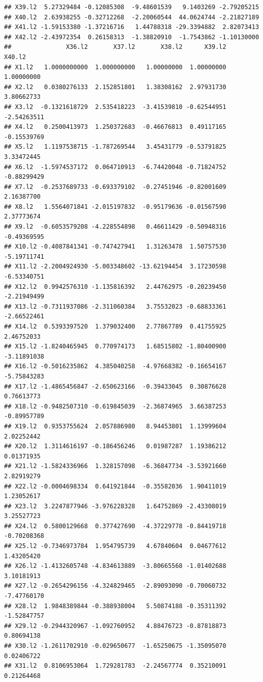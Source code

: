 \documentclass[]{article}
\begin{document}
\begin{verbatim}
## X39.l2  5.27329484 -0.12085308  -9.48601539   9.1403269 -2.79205215
## X40.l2  2.63938255 -0.32712268  -2.20060544  44.0624744 -2.21827189
## X41.l2 -1.59153380 -1.37216716   1.44788318 -29.3394882  2.82073413
## X42.l2 -2.43972354  0.26158313  -1.38820910  -1.7543862 -1.10130000
##               X36.l2       X37.l2       X38.l2      X39.l2      X40.l2
## X1.l2   1.0000000000  1.000000000   1.00000000  1.00000000  1.00000000
## X2.l2   0.0380276133  2.152851801   1.38308162  2.97931730  3.80662733
## X3.l2  -0.1321618729  2.535418223  -3.41539810 -0.62544951 -2.54263511
## X4.l2   0.2500413973  1.250372683  -0.46676813  0.49117165 -0.15539769
## X5.l2   1.1197538715 -1.787269544   3.45431779 -0.53791825  3.33472445
## X6.l2  -1.5974537172  0.064710913  -6.74420048 -0.71824752 -0.88299429
## X7.l2  -0.2537689733 -0.693379102  -0.27451946 -0.82001609  2.16387700
## X8.l2   1.5564071841 -2.015197832  -0.95179636 -0.01567590  2.37773674
## X9.l2  -0.6053579208 -4.228554898   0.46611429 -0.50948316 -0.49369595
## X10.l2 -0.4087841341 -0.747427941   1.31263478  1.50757530 -5.19711741
## X11.l2 -2.2004924930 -5.003348602 -13.62194454  3.17230598 -6.53340751
## X12.l2  0.9942576310 -1.135816392   2.44762975 -0.20239450 -2.21949499
## X13.l2 -0.7311937086 -2.311060384   3.75532023 -0.68833361 -2.66522461
## X14.l2  0.5393397520  1.379032400   2.77867789  0.41755925  2.46752033
## X15.l2 -1.8240465945  0.770974173   1.68515802 -1.80400900 -3.11891038
## X16.l2 -0.5016235862  4.385040258  -4.97668382 -0.16654167 -5.75843283
## X17.l2 -1.4865456847 -2.650623166  -0.39433045  0.30876628  0.76613773
## X18.l2 -0.9482507310 -0.619845039  -2.36874965  3.66387253 -0.89957789
## X19.l2  0.9353755624  2.057886980   8.94453801  1.13999604  2.02252442
## X20.l2  1.3114616197 -0.186456246   0.01987287  1.19386212  0.01371935
## X21.l2 -1.5824336966  1.328157098  -6.36847734 -3.53921660  2.82919279
## X22.l2 -0.0004698334  0.641921844  -0.35582036  1.90411019  1.23052617
## X23.l2  3.2247877946 -3.976228328   1.64752869 -2.43308019  3.25527723
## X24.l2  0.5800129668  0.377427690  -4.37229778 -0.84419718 -0.70208368
## X25.l2 -0.7346973784  1.954795739   4.67840604  0.04677612  1.43205420
## X26.l2 -1.4132605748 -4.834613889  -3.80665568 -1.01402688  3.10181913
## X27.l2 -0.2654296156 -4.324829465  -2.89093090 -0.70060732 -7.47760170
## X28.l2  1.9848389844 -0.388938004   5.50874188 -0.35311392 -1.52847757
## X29.l2 -0.2944320967 -1.092760952   4.88476723 -0.87818873  0.80694138
## X30.l2 -1.2611702910 -0.029650677  -1.65250675 -1.35095070  0.02406722
## X31.l2  0.8106953064  1.729281783  -2.24567774  0.35210091  0.21264468

\end{verbatim}
\end{document}
